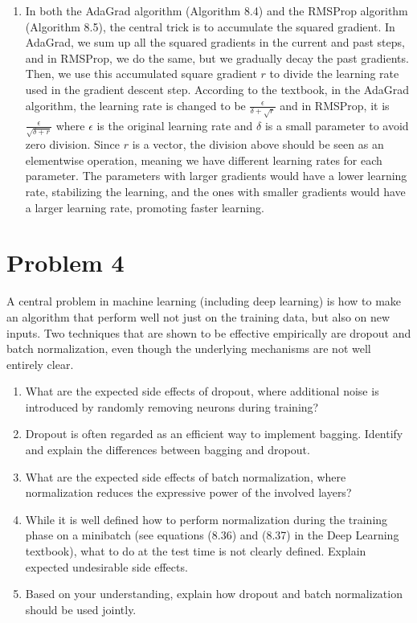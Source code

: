 \documentclass[
	12pt, %
]{../Template/fphw}
\begin{document}
\begin{enumerate}[label = (\arabic*)]
\item In both the AdaGrad algorithm (Algorithm 8.4) and the RMSProp algorithm (Algorithm 8.5), the central trick is to accumulate the squared gradient. In AdaGrad, we sum up all the squared gradients in the current and past steps, and in RMSProp, we do the same, but we gradually decay the past gradients. Then, we use this accumulated square gradient $r$ to divide the learning rate used in the gradient descent step. According to the textbook, in the AdaGrad algorithm, the learning rate is changed to be $\frac{\epsilon}{\delta+\sqrt{r} }$ and in RMSProp, it is $\frac{\epsilon}{\sqrt{\delta+r}}$ where $\epsilon$ is the original learning rate and $\delta$ is a small parameter to avoid zero division. Since $r$ is a vector, the division above should be seen as an elementwise operation, meaning we have different learning rates for each parameter. The parameters with larger gradients would have a lower learning rate, stabilizing the learning, and the ones with smaller gradients would have a larger learning rate, promoting faster learning.

\end{enumerate}

\section*{Problem 4}

\begin{problem}
A central problem in machine learning (including deep learning) is how to make
an algorithm that perform well not just on the training data, but also on new inputs. Two techniques that are shown to
be effective empirically are dropout and batch normalization, even though the underlying mechanisms are not well
entirely clear.
\begin{enumerate}[label=(\arabic*)]

\item What are the expected side effects of dropout, where additional noise is introduced by randomly removing
neurons during training?
\item Dropout is often regarded as an efficient way to implement bagging. Identify and explain the differences
between bagging and dropout.
\item What are the expected side effects of batch normalization, where normalization reduces the expressive power
of the involved layers?
\item While it is well defined how to perform normalization during the training phase on a minibatch (see equations
(8.36) and (8.37) in the Deep Learning textbook), what to do at the test time is not clearly defined. Explain
expected undesirable side effects.
\item Based on your understanding, explain how dropout and batch normalization should be used jointly.
\end{enumerate}
\end{problem}
\end{document}
